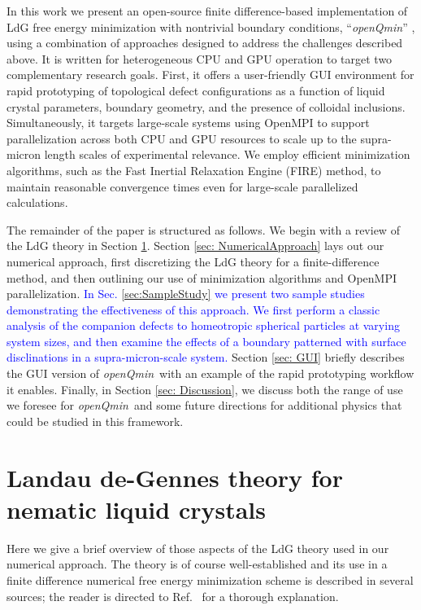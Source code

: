 \documentclass[utf8]{frontiersFPHY} %
\newcommand{\DMS}[1]{\textcolor{blue}{#1}}
\def\PackageName{\textit{openQmin}}
\begin{document}
In this work we present an open-source finite difference-based implementation of LdG free energy minimization with nontrivial boundary conditions, ``\PackageName'' \citep{landauDeGUI}, using a combination of approaches designed to address the challenges described above.  It is written for heterogeneous CPU and GPU operation  to target two complementary research goals. First, it offers a user-friendly GUI environment for rapid prototyping of topological defect configurations as a function of liquid crystal parameters, boundary geometry, and the presence of colloidal inclusions. Simultaneously, it targets large-scale systems using OpenMPI \citep{gabriel2004open} to support parallelization across both CPU and GPU resources to scale up to the supra-micron length scales of experimental relevance. We employ efficient minimization algorithms, such as the Fast Inertial Relaxation Engine (FIRE) method, to maintain reasonable convergence times even for large-scale parallelized calculations. 

The remainder of the paper is structured as follows. We begin with a review of the LdG theory in Section \ref{sec: LdGreview}. Section \ref{sec: NumericalApproach} lays out our numerical approach, first discretizing the LdG theory for a finite-difference method, and then outlining our use of minimization algorithms and OpenMPI parallelization. \DMS{In Sec. \ref{sec:SampleStudy} we present two sample studies demonstrating the effectiveness of this approach. We first perform a classic analysis of the companion defects to homeotropic spherical particles at varying system sizes, and then examine the effects of a boundary patterned with surface disclinations in a supra-micron-scale system.} Section \ref{sec: GUI} briefly describes the GUI version of \PackageName\ with an example of the rapid prototyping workflow it enables. Finally, in Section \ref{sec: Discussion}, we discuss both the range of use we foresee for \PackageName\  and some future directions for additional physics that could be studied in this framework. 


\section{Landau de-Gennes theory for nematic liquid crystals }\label{sec: LdGreview}
Here we give a brief overview of those aspects of the LdG theory used in our numerical approach. The theory is of course well-established \cite{deGennes_book} and its use in a finite difference numerical free energy minimization scheme is described in several sources; the reader is directed to  Ref.~\citep{ravnik2009landau} for a thorough explanation.
\end{document}

